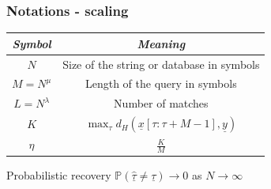 \documentclass[10pt,xcolor=table]{beamer}
\newcommand{\mbb}{\mathbb}
\newcommand{\xv}{\underline{x}}
\newcommand{\yv}{\underline{y}}
\begin{document}
\begin{frame}\frametitle{Notations - scaling}

	\begin{figure}
	\centering
	\scalebox{0.45}{}
\end{figure}
	\vspace{-8pt}
	{\small
	\begin{table}[h!]
		\label{Table:Notations3}
		\begin{center}
			\begin{tabular}{|c|c|} 	
				\hline		
				\textit{Symbol}		&  \textit{Meaning} \\		
				\hline
				$N$           		& Size of the string or database in symbols \\
				\hline
				$M = N^{\mu}$       & Length of the query in symbols \\
				\hline
				$L = N^\lambda$    &   Number of matches \\
				\hline
				$K$             &$\max_{\tau}d_{H}(\xv[\tau:\tau+M-1],\yv)$\\
				\hline
				$\eta$             &$\frac{K}{M}$\\
				\hline
			\end{tabular}
		\end{center}
	\end{table}
    }
    \begin{block}{Probabilistic recovery}
    $\mbb{P}(\hat{\underline{\tau}} \neq \underline{\tau}) \rightarrow 0$ as $N \rightarrow \infty$
    \end{block}
	\end{frame}	
\end{document}
